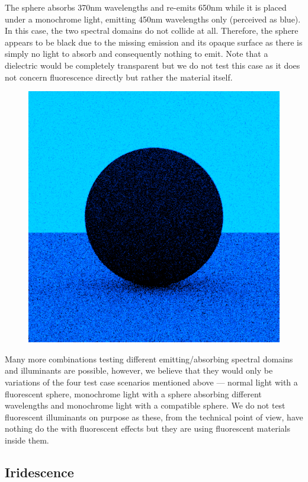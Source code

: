 \begin{description}
\begin{figure}[H]
		\caption{}
		\label{fig:fluorescent_sphere_mono_red}
	\end{figure}
	\item[450nm illuminant, 370nm absorption, 650 emission~\ref{fig:fluorescent_sphere_mono_invisible}] The sphere absorbs 370nm wavelengths and re-emits 650nm while it is placed under a monochrome light, emitting 450nm wavelengths only (perceived as blue). In this case, the two spectral domains do not collide at all. Therefore, the sphere appears to be black due to the missing emission and its opaque surface as there is simply no light to absorb and consequently nothing to emit. Note that a dielectric would be completely transparent but we do not test this case as it does not concern fluorescence directly but rather the material itself.
	\begin{figure}[H]
		\centering
		\includegraphics[width=.6\linewidth]{img/fluorescent_sphere_mono_invisible.png}
		\caption{}
		\label{fig:fluorescent_sphere_mono_invisible}
	\end{figure}
\end{description}

Many more combinations testing different emitting/absorbing spectral domains and illuminants are possible, however, we believe that they would only be variations of the four test case scenarios mentioned above --- normal light with a fluorescent sphere, monochrome light with a sphere absorbing different wavelengths and monochrome light with a compatible sphere. We do not test fluorescent illuminants on purpose as these, from the technical point of view, have nothing do the with fluorescent effects but they are using fluorescent materials inside them.

\subsection{Iridescence}

